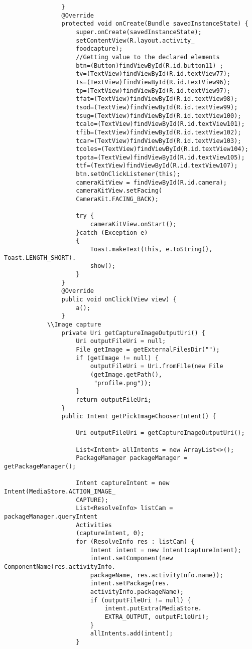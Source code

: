\documentclass[a4paper,12pt,toc=flat]{report}
\begin{document}
{{{{\begin{itemize}
\begin{verbatim}
 				}
 				@Override
 				protected void onCreate(Bundle savedInstanceState) {
 					super.onCreate(savedInstanceState);
 					setContentView(R.layout.activity_
 					foodcapture);
 					//Getting value to the declared elements
 					btn=(Button)findViewById(R.id.button11) ;
 					tv=(TextView)findViewById(R.id.textView77);
 					ts=(TextView)findViewById(R.id.textView96);
 					tp=(TextView)findViewById(R.id.textView97);
 					tfat=(TextView)findViewById(R.id.textView98);
 					tsod=(TextView)findViewById(R.id.textView99);
 					tsug=(TextView)findViewById(R.id.textView100);
 					tcalo=(TextView)findViewById(R.id.textView101);
 					tfib=(TextView)findViewById(R.id.textView102);
 					tcar=(TextView)findViewById(R.id.textView103);
 					tcoles=(TextView)findViewById(R.id.textView104);
 					tpota=(TextView)findViewById(R.id.textView105);
 					ttf=(TextView)findViewById(R.id.textView107);
 					btn.setOnClickListener(this);
 					cameraKitView = findViewById(R.id.camera);
 					cameraKitView.setFacing(
 					CameraKit.FACING_BACK);
 					
 					try {
 						cameraKitView.onStart();
 					}catch (Exception e)
 					{
 						Toast.makeText(this, e.toString(), Toast.LENGTH_SHORT).
 						show();
 					}
 				}
 				@Override
 				public void onClick(View view) {
 					a();
 				}
 			\\Image capture
 				private Uri getCaptureImageOutputUri() {
 					Uri outputFileUri = null;
 					File getImage = getExternalFilesDir("");
 					if (getImage != null) {
 						outputFileUri = Uri.fromFile(new File
 						(getImage.getPath(),
 						 "profile.png"));
 					}
 					return outputFileUri;
 				}
 				public Intent getPickImageChooserIntent() {
 					
 					Uri outputFileUri = getCaptureImageOutputUri();
 					
 					List<Intent> allIntents = new ArrayList<>();
 					PackageManager packageManager = getPackageManager();
 					
 					Intent captureIntent = new Intent(MediaStore.ACTION_IMAGE_
 					CAPTURE);
 					List<ResolveInfo> listCam = packageManager.queryIntent
 					Activities
 					(captureIntent, 0);
 					for (ResolveInfo res : listCam) {
 						Intent intent = new Intent(captureIntent);
 						intent.setComponent(new ComponentName(res.activityInfo.
 						packageName, res.activityInfo.name));
 						intent.setPackage(res.
 						activityInfo.packageName);
 						if (outputFileUri != null) {
 							intent.putExtra(MediaStore.
 							EXTRA_OUTPUT, outputFileUri);
 						}
 						allIntents.add(intent);
 					}
 					

\end{verbatim}
\end{itemize}}}}}
\end{document}
